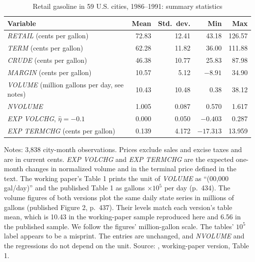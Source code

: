 \begin{table}[htbp]
\centering
\caption{Retail gasoline in 59 U.S. cities, 1986--1991: summary statistics}\label{tab:13-bs-t1}
\begin{tabular}{lrrrr}
\toprule
Variable & Mean & Std.\ dev. & Min & Max\\
\midrule
\textit{RETAIL} (cents per gallon) & 72.83 & 12.41 & 43.18 & 126.57\\
\textit{TERM} (cents per gallon) & 62.28 & 11.82 & 36.00 & 111.88\\
\textit{CRUDE} (cents per gallon) & 46.38 & 10.77 & 25.83 & 87.98\\
\textit{MARGIN} (cents per gallon) & 10.57 & 5.12 & $-8.91$ & 34.90\\
\textit{VOLUME} (million gallons per day, see notes) & 10.43 & 10.48 & 0.38 & 38.12\\
\textit{NVOLUME} & 1.005 & 0.087 & 0.570 & 1.617\\
\textit{EXP VOLCHG}, $\hat\eta=-0.1$ & 0.000 & 0.050 & $-0.403$ & 0.287\\
\textit{EXP TERMCHG} (cents per gallon) & 0.139 & 4.172 & $-17.313$ & 13.959\\
\bottomrule
\end{tabular}

\smallskip
\begin{minipage}{0.86\textwidth}\footnotesize
Notes: 3,838 city-month observations. Prices exclude sales and excise taxes and are in current cents.
\textit{EXP VOLCHG} and \textit{EXP TERMCHG} are the expected one-month changes in normalized volume and in the
terminal price defined in the text. The working paper's Table 1 prints the unit of \textit{VOLUME} as ``(00,000
gal/day)'' and the published Table 1 as gallons $\times 10^{5}$ per day (p.~434). The volume figures of both versions
plot the same daily state series in millions of gallons (published Figure 2, p.~437). Their levels match each
version's table mean, which is 10.43 in the working-paper sample reproduced here and 6.56 in the published sample. We follow the
figures' million-gallon scale. The tables' $10^{5}$ label appears to be a misprint. The entries are unchanged, and
\textit{NVOLUME} and the regressions do not depend on the unit. Source: \citet{BorensteinShepard1996},
working-paper version, Table 1.
\end{minipage}
\end{table}

